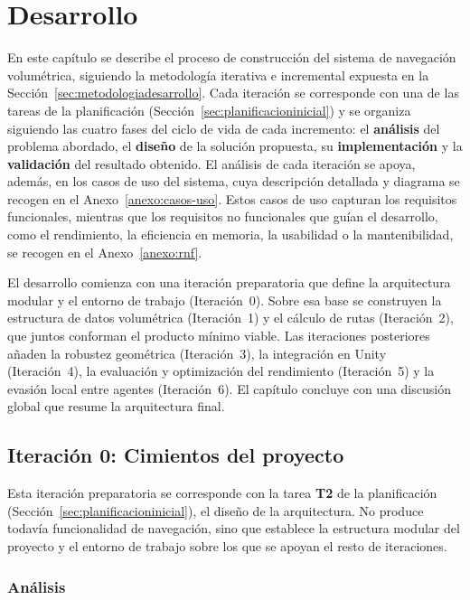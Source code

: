 \chapter{Desarrollo}
\label{chap:desarrollo}

En este capítulo se describe el proceso de construcción del sistema de navegación volumétrica, siguiendo la metodología iterativa e incremental expuesta en la Sección~\ref{sec:metodologiadesarrollo}.
Cada iteración se corresponde con una de las tareas de la planificación (Sección~\ref{sec:planificacioninicial}) y se organiza siguiendo las cuatro fases del ciclo de vida de cada incremento: el \textbf{análisis} del problema abordado, el \textbf{diseño} de la solución propuesta, su \textbf{implementación} y la \textbf{validación} del resultado obtenido.
El análisis de cada iteración se apoya, además, en los casos de uso del sistema, cuya descripción detallada y diagrama se recogen en el Anexo~\ref{anexo:casos-uso}.
Estos casos de uso capturan los requisitos funcionales, mientras que los requisitos no funcionales que guían el desarrollo, como el rendimiento, la eficiencia en memoria, la usabilidad o la mantenibilidad, se recogen en el Anexo~\ref{anexo:rnf}.

El desarrollo comienza con una iteración preparatoria que define la arquitectura modular y el entorno de trabajo (Iteración~0).
Sobre esa base se construyen la estructura de datos volumétrica (Iteración~1) y el cálculo de rutas (Iteración~2), que juntos conforman el producto mínimo viable.
Las iteraciones posteriores añaden la robustez geométrica (Iteración~3), la integración en Unity (Iteración~4), la evaluación y optimización del rendimiento (Iteración~5) y la evasión local entre agentes (Iteración~6).
El capítulo concluye con una discusión global que resume la arquitectura final.

\section{Iteración 0: Cimientos del proyecto}

Esta iteración preparatoria se corresponde con la tarea \textbf{T2} de la planificación (Sección~\ref{sec:planificacioninicial}), el diseño de la arquitectura.
No produce todavía funcionalidad de navegación, sino que establece la estructura modular del proyecto y el entorno de trabajo sobre los que se apoyan el resto de iteraciones.

\subsection{Análisis}


